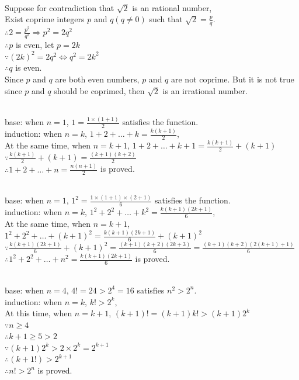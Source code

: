 \documentclass[12pt,a4paper]{article}
\begin{document}
\vspace{1.5em}
\\
Suppose for contradiction that $ \sqrt{2} $ is an rational number, \\
Exist coprime integers $p$ and $q(q\neq 0)$ such that $ \sqrt{2}=\frac{p}{q} $.\\
$\therefore 2=\frac{p^2}{q^2} \Rightarrow p^2=2q^2$\\
$\therefore p$ is even, let $p=2k$\\
$\because (2k)^2=2q^2\Leftrightarrow q^2=2k^2$\\
$\therefore q$ is even.\\
Since $p$ and $q$ are both even numbers, $p$ and $q$ are not coprime. 
But it is not true since $p$ and $q$ should be coprimed, then $ \sqrt{2} $ is an irrational number.

\vspace{1.5em}
\\
base: when $n=1$, $1=\frac{1\times (1+1)}{2}$ satisfies the function.\\
induction: when $n=k$, $1+2+\dots +k=\frac{k(k+1)}{2}$,\\
At the same time, when $n=k+1$, $1+2+\dots +k+1=\frac{k(k+1)}{2}+(k+1)$\\
$\because \frac{k(k+1)}{2}+(k+1)= \frac{(k+1)(k+2)}{2}$ \\
$\therefore 1+2+\dots +n=\frac{n(n+1)}{2}$ is proved.

\vspace{1.5em}
\\
base: when $n=1$, $1^2=\frac{1\times (1+1)\times (2+1)}{6}$ satisfies the function.\\
induction: when $n=k$, $1^2+2^2+\dots +k^2=\frac{k(k+1)(2k+1)}{6}$,\\
At the same time, when $n=k+1$, $1^2+2^2+\dots +(k+1)^2=\frac{k(k+1)(2k+1)}{6}+(k+1)^2$\\
$\because \frac{k(k+1)(2k+1)}{6}+(k+1)^2=\frac{(k+1)(k+2)(2k+3)}{6}=\frac{(k+1)(k+2)(2(k+1)+1)}{6}$\\
$\therefore 1^2+2^2+\dots +n^2=\frac{k(k+1)(2k+1)}{6}$ is proved.

\vspace{1.5em}
\\
base: when $n=4$, $4!=24>2^4=16$ satisfies $n^2>2^n$.\\
induction: when $n=k$, $k!>2^k$,\\
At this time, when $n=k+1$, $(k+1)!=(k+1)k!>(k+1)2^k$ \\
$\because n\geqslant 4$\\
$\therefore k+1\geqslant  5 >2$\\
$\because (k+1)2^k>2\times 2^k=2^{k+1}$\\
$\therefore (k+1!)>2^{k+1}$\\
$\therefore n!>2^n$ is proved.
\end{document}
